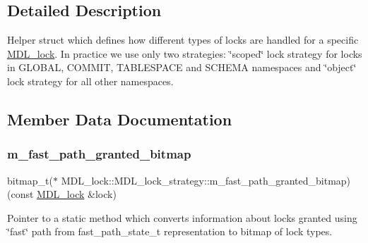 \subsection{Detailed Description}
Helper struct which defines how different types of locks are handled for a specific \mbox{\hyperlink{classMDL__lock}{M\+D\+L\+\_\+lock}}. In practice we use only two strategies\+: \char`\"{}scoped\char`\"{} lock strategy for locks in G\+L\+O\+B\+AL, C\+O\+M\+M\+IT, T\+A\+B\+L\+E\+S\+P\+A\+CE and S\+C\+H\+E\+MA namespaces and \char`\"{}object\char`\"{} lock strategy for all other namespaces. 

\subsection{Member Data Documentation}
\mbox{\label{structMDL__lock_1_1MDL__lock__strategy_a36f8689c09e695f01314f2fe57faca74}} 
\subsubsection{\texorpdfstring{m\+\_\+fast\+\_\+path\+\_\+granted\+\_\+bitmap}{m\_fast\_path\_granted\_bitmap}}
{\footnotesize\ttfamily bitmap\+\_\+t($\ast$ M\+D\+L\+\_\+lock\+::\+M\+D\+L\+\_\+lock\+\_\+strategy\+::m\+\_\+fast\+\_\+path\+\_\+granted\+\_\+bitmap) (const \mbox{\hyperlink{classMDL__lock}{M\+D\+L\+\_\+lock}} \&lock)}

Pointer to a static method which converts information about locks granted using \char`\"{}fast\char`\"{} path from fast\+\_\+path\+\_\+state\+\_\+t representation to bitmap of lock types. \mbox{\label{structMDL__lock_1_1MDL__lock__strategy_adcee4cc0d160ac5a2fb2c3633b103714}} 
